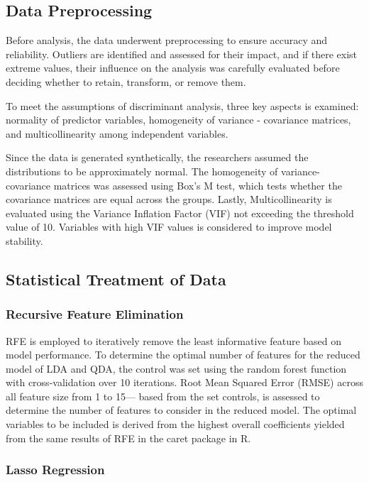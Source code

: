 \documentclass[12pt]{article}
\begin{document}
\subsection{Data Preprocessing}
\noindent

Before analysis, the data underwent preprocessing to ensure accuracy and reliability. Outliers are identified and assessed 
for their impact, and if there exist extreme values, their influence on the analysis was carefully evaluated before deciding whether 
to retain, transform, or remove them. 

To meet the assumptions of discriminant analysis, three key aspects is examined: normality of predictor variables, homogeneity of variance - covariance 
matrices, and multicollinearity among independent variables. 

Since the data is generated synthetically, the researchers assumed the distributions to be approximately normal. The homogeneity of variance-covariance matrices was assessed
using Box's M test, which tests whether the covariance matrices are equal across the groups. Lastly, Multicollinearity is evaluated using the Variance Inflation Factor (VIF) not exceeding
the threshold value of 10. Variables with high VIF values is considered to improve model stability. 

\subsection{Statistical Treatment of Data}
\subsubsection{Recursive Feature Elimination}
\noindent

RFE is employed to iteratively remove the least informative feature based on model performance. To determine the optimal number of features for the reduced model of LDA and QDA, the control was set using
the random forest function with cross-validation over 10 iterations. Root Mean Squared Error (RMSE) across all feature size from 1 to 15— based from the set controls, is assessed to determine the number of features to consider in the 
reduced model. The optimal variables to be included is derived from the highest overall coefficients yielded from the same results of RFE in the caret package in R. 

\subsubsection{Lasso Regression}
\noindent
\end{document}
